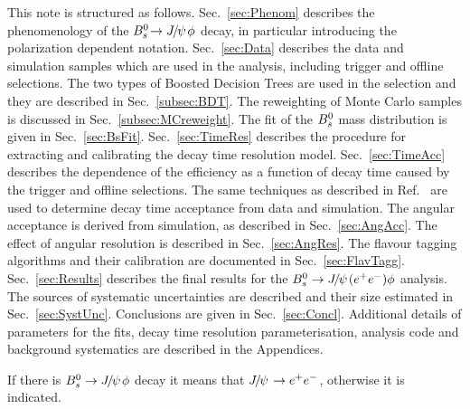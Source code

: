 This note is structured as follows. Sec.~\ref{sec:Phenom} describes the phenomenology of the ${{B}^0_{s}}\!\rightarrow {\ensuremath{{J\mskip -3mu/\mskip -2mu\psi\mskip 2mu}}}\phi$ decay, in particular introducing the polarization dependent notation. Sec.~\ref{sec:Data} describes the data and simulation samples which are used in the analysis, including trigger and offline selections. The two types of Boosted Decision Trees are used in the selection and they are described in Sec.~\ref{subsec:BDT}. The reweighting of Monte Carlo samples is discussed in Sec.~\ref{subsec:MCreweight}. The fit of the ${{B}^0_{s}}$ mass distribution is given in Sec.~\ref{sec:BsFit}. Sec.~\ref{sec:TimeRes} describes the procedure for extracting and calibrating the decay time resolution model. Sec.~\ref{sec:TimeAcc} describes the dependence of the efficiency as a function of decay time caused by the trigger and offline selections. The same techniques as described in Ref.~\cite{Aaij:2013oba} are used to determine decay time acceptance from data and simulation. The angular acceptance is derived from simulation, as described in Sec.~\ref{sec:AngAcc}. The effect of angular resolution is described in Sec.~\ref{sec:AngRes}. The flavour tagging algorithms and their calibration are documented in Sec.~\ref{sec:FlavTagg}. %
Sec.~\ref{sec:Results} describes the final results for the ${{B}^0_{s}}\rightarrow{\ensuremath{{J\mskip -3mu/\mskip -2mu\psi\mskip 2mu}}}({e^+e^-})\phi$ analysis. The sources of systematic uncertainties are described and their size estimated in Sec.~\ref{sec:SystUnc}. Conclusions are given in Sec.~\ref{sec:Concl}. Additional details of parameters for the fits, decay time resolution parameterisation, analysis code and background systematics are described in the Appendices.

If there is ${{B}^0_{s}}\rightarrow{\ensuremath{{J\mskip -3mu/\mskip -2mu\psi\mskip 2mu}}}\phi$ decay it means that ${{J\mskip -3mu/\mskip -2mu\psi\mskip 2mu}}\rightarrow{\ensuremath{e^+e^-}}$, otherwise it is indicated.


